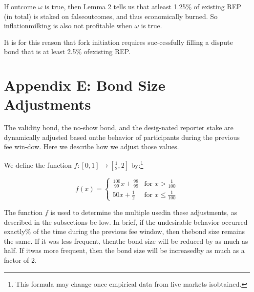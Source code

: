 \documentclass[12pt,floatfix,reprint,nofootinbib,amsmath,amssymb,epsfig,pre,floats,letterpaper,groupedaffiliation]{revtex4-1}
\theoremstyle{definition}
\theoremstyle{definition}
\begin{document}
If outcome $\omega$ is true, then Lemma 2 tells us that at\linebreak least 1.25\% of existing REP (in total) is staked on false\linebreak outcomes, and thus economically burned. So inflation\linebreak milking is also not profitable when $\omega$ is true.

It is for this reason that fork initiation requires suc-\linebreak cessfully filling a dispute bond that is at least 2.5\% of\linebreak existing REP.

\section*{Appendix E: Bond Size Adjustments}

The validity bond, the no-show bond, and the desig-\linebreak nated reporter stake are dynamically adjusted based on\linebreak the behavior of participants during the previous fee win-\linebreak dow. Here we describe how we adjust those values.

We define the function $f : [0, 1] \rightarrow [\frac{1}{2}, 2]$ by:\footnote{This formula may change once empirical data from live markets is\linebreak obtained.}

\begin{equation}
f(x) = \begin{cases}
\frac{100}{99}x + \frac{98}{99} & \text{for } x > \frac{1}{100} \\
50x + \frac{1}{2} & \text{for } x \leq \frac{1}{100}
\end{cases}
\end{equation}

The function $f$ is used to determine the multiple used\linebreak in these adjustments, as described in the subsections be-\linebreak low. In brief, if the undesirable behavior occurred exactly\% of the time during the previous fee window, then the\linebreak bond size remains the same. If it was less frequent, then\linebreak the bond size will be reduced by as much as half. If it\linebreak was more frequent, then the bond size will be increased\linebreak by as much as a factor of 2.
\end{document}
